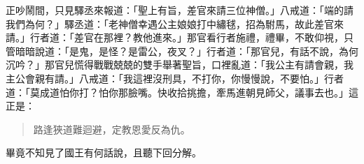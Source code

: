 正吵鬧間，只見驛丞來報道：「聖上有旨，差官來請三位神僧。」八戒道：「端的請我們為何？」驛丞道：「老神僧幸遇公主娘娘打中繡毬，招為駙馬，故此差官來請。」行者道：「差官在那裡？教他進來。」那官看行者施禮，禮畢，不敢仰視，只管暗暗說道：「是鬼，是怪？是雷公，夜叉？」行者道：「那官兒，有話不說，為何沉吟？」那官兒慌得戰戰兢兢的雙手舉著聖旨，口裡亂道：「我公主有請會親，我主公會親有請。」八戒道：「我這裡沒刑具，不打你，你慢慢說，不要怕。」行者道：「莫成道怕你打？怕你那臉嘴。快收拾挑擔，牽馬進朝見師父，議事去也。」這正是：
\begin{quote}
路逢狹道難迴避，定教恩愛反為仇。
\end{quote}

畢竟不知見了國王有何話說，且聽下回分解。

